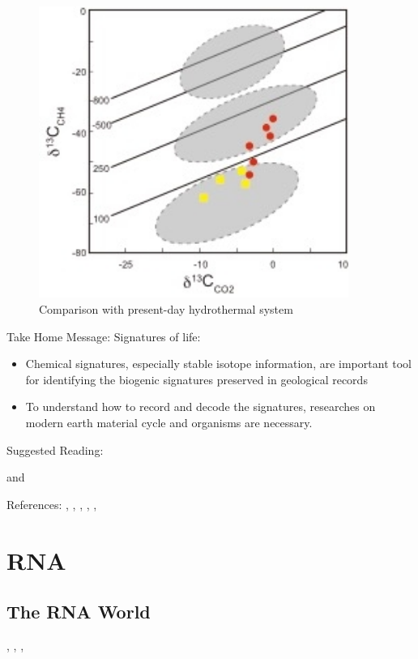 \documentclass[]{article}
\begin{document}
\begin{figure}[H]
	\caption{Comparison with present-day hydrothermal system}\label{fig:ueno_comparison}
	\includegraphics[width=0.9\textwidth]{ueno_comparison}
\end{figure}

Take Home Message: Signatures of life:
\begin{itemize}
	\item Chemical signatures, especially stable isotope information, are important tool for identifying the biogenic signatures preserved in geological records
	\item To understand how to record and decode the signatures, researches on modern earth material cycle and organisms are 	necessary.
\end{itemize}

Suggested Reading:

\cite{sharp2017principles} and \cite{allegre2008isotope}

References:
\cite{ueno2006evidence},
 \cite{bell2015potentially}, \cite{rosing199913c},  \cite{shen2001isotopic}, \cite{summons19992}, \cite{han1992megascopic}

\section{RNA}

\subsection{The RNA World}
\cite{robertson2012origins}, \cite{joyce2018protocells}, \cite{hud2018searching},  \cite{hoshika2019hachimoji}
\end{document}

